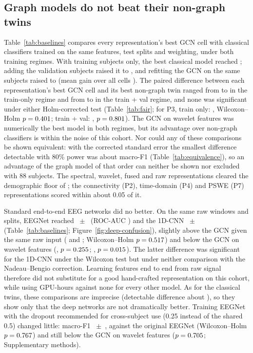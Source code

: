 \subsection{Graph models do not beat their non-graph twins}\label{sec:res-baselines}
Table~\ref{tab:baselines} compares every representation's best GCN cell with classical classifiers
trained on the same features, test splits and weighting, under both training regimes. With training
subjects only, the best classical model reached \classicalTrBest{}; adding the validation subjects
raised it to \classicalTvBest{}, and refitting the GCN on the same subjects raised \bestCell{} to
 (mean gain over all cells ). The paired difference between each
representation's best GCN cell and its best non-graph twin ranged from \fairTrDeltaMin{} to
\fairTrDeltaMax{} in the train-only regime and from \fairTvDeltaMin{} to \fairTvDeltaMax{} in the
train + val regime, and none was significant under either Holm-corrected test (Table~\ref{tab:fair};
for P3, train only: \fairTrPThreeDelta{}, Wilcoxon--Holm $p=0.401$; train + val:
\fairTvPThreeDelta{}, $p=0.801$). The GCN on wavelet features was numerically the best
model in both regimes, but its advantage over non-graph classifiers is within the noise of this
cohort. Nor could any of these comparisons be shown equivalent: with the corrected standard error the
smallest difference detectable with 80\% power was about \eqGvcMde{} macro-F1
(Table~\ref{tab:equivalence}), so an advantage of the graph model of that order can neither be shown nor
excluded with 88 subjects. The spectral, wavelet, fused and raw representations cleared the demographic floor of
\demoFOne{}; the connectivity (P2), time-domain (P4) and PSWE (P7) representations scored within
about 0.05 of it.

Standard end-to-end EEG networks did no better. On the same raw windows and splits, EEGNet reached
\deepEegnetFOne{}~$\pm$~\deepEegnetSd{} (ROC-AUC \deepEegnetAuc{}) and the 1D-CNN \deepCnnFOne{}~$\pm$~\deepCnnSd{}
(Table~\ref{tab:baselines}; Figure~\ref{fig:deep-confusion}), slightly above the GCN given the same raw
input (\deepEegnetVsRawDelta{} and \deepCnnVsRawDelta{}; Wilcoxon--Holm $p=0.517$) and below
the GCN on wavelet features (\deepEegnetVsBestDelta{}, $p=0.255$; \deepCnnVsBestDelta{},
$p=0.015$). The latter difference was significant for the 1D-CNN under the Wilcoxon test
but under neither comparison with the Nadeau--Bengio correction. Learning features end to end from raw
signal therefore did not substitute for a good hand-crafted representation on this cohort, while
using \deepGpuHours{} GPU-hours against none for every other model. As for the classical twins, these
comparisons are imprecise (detectable difference about \eqDeepMde{}), so they show only that the deep
networks are not dramatically better. Training EEGNet with the dropout recommended for cross-subject use
(0.25 instead of the shared 0.5) changed little: macro-F1 \dropFOne{}~$\pm$~\dropSd{}, \dropVsOldDelta{}
against the original EEGNet (Wilcoxon--Holm $p=0.767$) and still \dropVsBestDelta{} below the GCN on
wavelet features ($p=0.705$; Supplementary methods).

